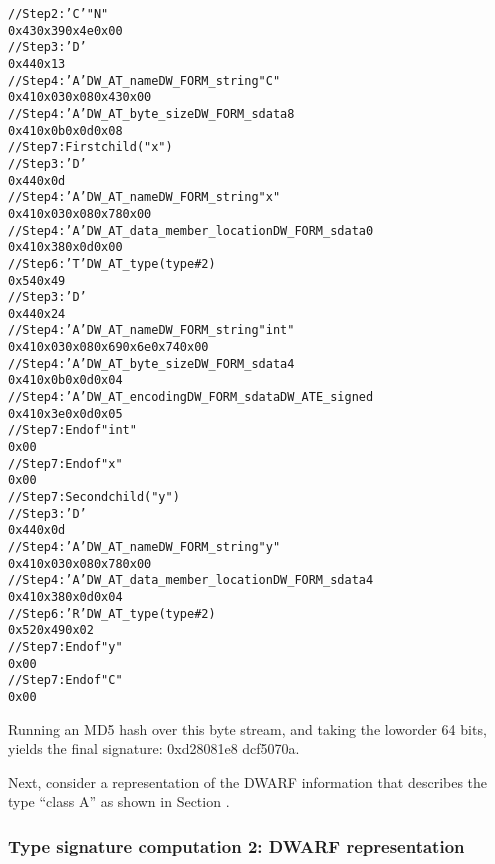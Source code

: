 \begin{alltt}
// Step 2: 'C'  "N"
0x43 0x39 0x4e 0x00
// Step 3: 'D' 
0x44 0x13
// Step 4: 'A' DW\_AT\_name DW\_FORM\_string "C"
0x41 0x03 0x08 0x43 0x00
// Step 4: 'A' DW\_AT\_byte\_size DW\_FORM\_sdata 8
0x41 0x0b 0x0d 0x08
// Step 7: First child ("x")
    // Step 3: 'D' 
    0x44 0x0d
    // Step 4: 'A' DW\_AT\_name DW\_FORM\_string "x"
    0x41 0x03 0x08 0x78 0x00
    // Step 4: 'A' DW\_AT\_data\_member\_location DW\_FORM\_sdata 0
    0x41 0x38 0x0d 0x00
    // Step 6: 'T' DW\_AT\_type (type \#2)
    0x54 0x49
        // Step 3: 'D' 
        0x44 0x24
        // Step 4: 'A' DW\_AT\_name DW\_FORM\_string "int"
        0x41 0x03 0x08 0x69 0x6e 0x74 0x00
        // Step 4: 'A' DW\_AT\_byte\_size DW\_FORM\_sdata 4
        0x41 0x0b 0x0d 0x04
        // Step 4: 'A' DW\_AT\_encoding DW\_FORM\_sdata DW\_ATE\_signed
        0x41 0x3e 0x0d 0x05
        // Step 7: End of  "int"
        0x00
    // Step 7: End of  "x"
    0x00
// Step 7: Second child ("y")
    // Step 3: 'D' 
    0x44 0x0d
    // Step 4: 'A' DW\_AT\_name DW\_FORM\_string "y"
    0x41 0x03 0x08 0x78 0x00
    // Step 4: 'A' DW\_AT\_data\_member\_location DW\_FORM\_sdata 4
    0x41 0x38 0x0d 0x04
    // Step 6: 'R' DW\_AT\_type (type \#2)
    0x52 0x49 0x02
    // Step 7: End of  "y"
    0x00
// Step 7: End of  "C"
0x00
\end{alltt}

Running an MD5 hash over this byte stream, and taking the
low\dash order 64 bits, yields the final signature: 
0xd28081e8 dcf5070a.

Next, consider a representation of the DWARF information that
describes the type ``class A'' as shown in 
Section .


\subsubsection{Type signature  computation 2: DWARF representation}
\label{app:typesignaturecomputation2dwarfrepresentation}

